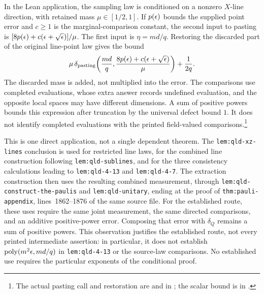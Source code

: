 \documentclass[11pt]{article}
\begin{document}
In the Lean application, the sampling law is conditioned on a nonzero
$X$-line direction, with retained mass $\mu\in[1/2,1]$. If $p(\epsilon)$ bounds
the supplied point error and $c\geq1$ is the marginal-comparison constant,
the second input to pasting is
$[8p(\epsilon)+c(\epsilon+\sqrt{\epsilon})]/\mu$. The first input is $\eta=md/q$.
Restoring the discarded part of the original line-point law gives the bound
\[
 \mu\,\delta_{\mathrm{pasting}}\!\left(
   \frac{md}{q},\frac{8p(\epsilon)+c(\epsilon+\sqrt{\epsilon})}{\mu}\right)
   +\frac{1}{2q}.
\]
The discarded mass is added, not multiplied into the error. The comparisons
use completed evaluations, whose extra answer records undefined evaluation,
and the opposite local spaces may have different dimensions. A sum of
positive powers bounds this expression after truncation by the universal
defect bound $1$. It does not identify completed evaluations with the printed
field-valued comparisons.\footnote{The actual pasting call and restoration
are  and
 in
; the scalar bound
is  in
.}

This is one direct application, not a single dependent theorem. The
\texttt{lem:qld-xz-lines} conclusion is used for restricted line laws, for
the combined line construction following \texttt{lem:qld-sublines}, and for
the three consistency calculations leading to \texttt{lem:qld-4-13} and
\texttt{lem:qld-4-7}. The extraction construction then uses the resulting
combined measurement, through \texttt{lem:qld-construct-the-paulis} and
\texttt{lem:qld-unitary}, ending at the proof of
\texttt{thm:pauli-appendix}, lines~1862--1876 of the same source file.
For the established route, these uses require the same joint measurement,
the same directed comparisons, and an additive positive-power error.
Composing that error with $\delta_Q$ remains a sum of positive powers.
This observation justifies the established route, not every printed
intermediate assertion: in particular, it does not establish
$\operatorname{poly}(m^2\epsilon,md/q)$ in \texttt{lem:qld-4-13} or the
source-law comparisons. No established use requires the particular
exponents of the conditional proof.
\end{document}
